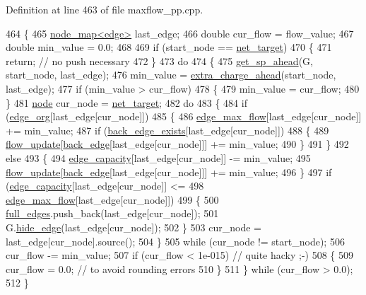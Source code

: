 Definition at line 463 of file maxflow\+\_\+pp.\+cpp.


\begin{DoxyCode}
464 \{
465     \mbox{\hyperlink{classnode__map}{node\_map<edge>}} last\_edge;
466     \textcolor{keywordtype}{double} cur\_flow = flow\_value;
467     \textcolor{keywordtype}{double} min\_value = 0.0;
468 
469     \textcolor{keywordflow}{if} (start\_node == \mbox{\hyperlink{classmaxflow__pp_a10f0b047011e04cb4816a824da5b7892}{net\_target}})
470     \{
471     \textcolor{keywordflow}{return}; \textcolor{comment}{// no push necessary}
472     \}
473     \textcolor{keywordflow}{do}
474     \{
475     \mbox{\hyperlink{classmaxflow__pp_a340e4b9909a44ed7003760017c761e3b}{get\_sp\_ahead}}(G, start\_node, last\_edge);
476     min\_value = \mbox{\hyperlink{classmaxflow__pp_af60a96de8ef929ceefd32d387e8e1638}{extra\_charge\_ahead}}(start\_node, last\_edge);
477     \textcolor{keywordflow}{if} (min\_value > cur\_flow)
478     \{
479         min\_value = cur\_flow;
480     \}
481     \mbox{\hyperlink{classnode}{node}} cur\_node = \mbox{\hyperlink{classmaxflow__pp_a10f0b047011e04cb4816a824da5b7892}{net\_target}};
482     \textcolor{keywordflow}{do}
483     \{
484         \textcolor{keywordflow}{if} (\mbox{\hyperlink{classmaxflow__pp_aca9ce457300e11b97cec3446315fda1c}{edge\_org}}[last\_edge[cur\_node]])
485         \{
486         \mbox{\hyperlink{classmaxflow__pp_a25d5bb2ab6c775a634dacf408ff55a83}{edge\_max\_flow}}[last\_edge[cur\_node]] += min\_value;
487         \textcolor{keywordflow}{if} (\mbox{\hyperlink{classmaxflow__pp_a50e9c82f1e720b8340ea4dc6d438f110}{back\_edge\_exists}}[last\_edge[cur\_node]])
488         \{
489             \mbox{\hyperlink{classmaxflow__pp_ad37aff831935b2cfd4b03bc4a6da06ce}{flow\_update}}[\mbox{\hyperlink{classmaxflow__pp_a9fdef5a86459eaf9634737094f3de250}{back\_edge}}[last\_edge[cur\_node]]] += min\_value;
490         \}
491         \}
492         \textcolor{keywordflow}{else}
493         \{
494         \mbox{\hyperlink{classmaxflow__pp_af3cdc4999a86322271a80b1855d58629}{edge\_capacity}}[last\_edge[cur\_node]] -= min\_value;
495         \mbox{\hyperlink{classmaxflow__pp_ad37aff831935b2cfd4b03bc4a6da06ce}{flow\_update}}[\mbox{\hyperlink{classmaxflow__pp_a9fdef5a86459eaf9634737094f3de250}{back\_edge}}[last\_edge[cur\_node]]] += min\_value;
496         \}
497         \textcolor{keywordflow}{if} (\mbox{\hyperlink{classmaxflow__pp_af3cdc4999a86322271a80b1855d58629}{edge\_capacity}}[last\_edge[cur\_node]] <= 
498         \mbox{\hyperlink{classmaxflow__pp_a25d5bb2ab6c775a634dacf408ff55a83}{edge\_max\_flow}}[last\_edge[cur\_node]])
499         \{
500         \mbox{\hyperlink{classmaxflow__pp_a504adabbe1e7b11a910d6c43a6b71a75}{full\_edges}}.push\_back(last\_edge[cur\_node]);
501         G.\mbox{\hyperlink{classgraph_ab2f8520bcac080d73c55228fecc61825}{hide\_edge}}(last\_edge[cur\_node]);
502         \}
503         cur\_node = last\_edge[cur\_node].source();
504     \}
505     \textcolor{keywordflow}{while} (cur\_node != start\_node);
506     cur\_flow -= min\_value;
507     \textcolor{keywordflow}{if} (cur\_flow < 1e-015)  \textcolor{comment}{// quite hacky ;-)}
508     \{
509         cur\_flow = 0.0; \textcolor{comment}{// to avoid rounding errors}
510     \}
511     \} \textcolor{keywordflow}{while} (cur\_flow > 0.0);
512 \}
\end{DoxyCode}
